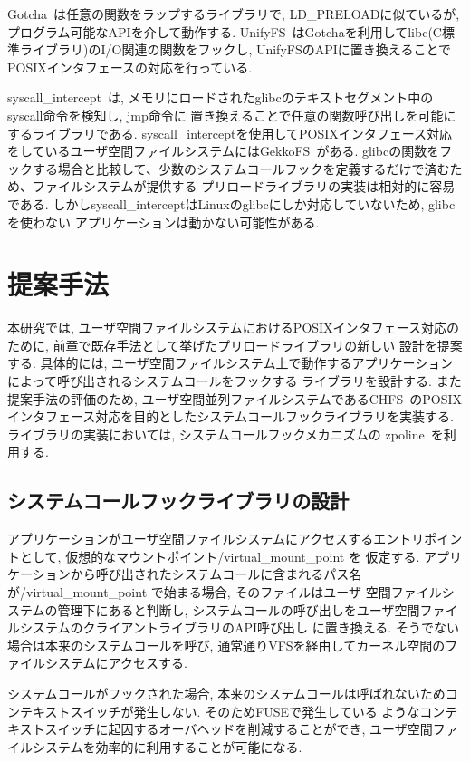 \documentclass[a4paper,11pt]{jreport}
\begin{document}
Gotcha~\cite{gotcha}は任意の関数をラップするライブラリで, LD\_PRELOADに似ているが, プログラム可能なAPIを介して動作する. 
UnifyFS~\cite{10177390}はGotchaを利用してlibc(C標準ライブラリ)のI/O関連の関数をフックし, UnifyFSのAPIに置き換えることで
POSIXインタフェースの対応を行っている.

syscall\_intercept~\cite{syscall-intercept}は, メモリにロードされたglibcのテキストセグメント中のsyscall命令を検知し, jmp命令に
置き換えることで任意の関数呼び出しを可能にするライブラリである.
syscall\_interceptを使用してPOSIXインタフェース対応をしているユーザ空間ファイルシステムにはGekkoFS~\cite{8514892}がある.
glibcの関数をフックする場合と比較して、少数のシステムコールフックを定義するだけで済むため、ファイルシステムが提供する
プリロードライブラリの実装は相対的に容易である. しかしsyscall\_interceptはLinuxのglibcにしか対応していないため, glibcを使わない
アプリケーションは動かない可能性がある.

\chapter{提案手法}
本研究では, ユーザ空間ファイルシステムにおけるPOSIXインタフェース対応のために, 前章で既存手法として挙げたプリロードライブラリの新しい
設計を提案する. 具体的には, ユーザ空間ファイルシステム上で動作するアプリケーションによって呼び出されるシステムコールをフックする
ライブラリを設計する. また提案手法の評価のため, ユーザ空間並列ファイルシステムであるCHFS~\cite{tatebe2022chfs}のPOSIX
インタフェース対応を目的としたシステムコールフックライブラリを実装する. ライブラリの実装においては, システムコールフックメカニズムの
zpoline~\cite{288689}を利用する.


\section{システムコールフックライブラリの設計}
アプリケーションがユーザ空間ファイルシステムにアクセスするエントリポイントとして, 仮想的なマウントポイント/virtual\_mount\_point を
仮定する. アプリケーションから呼び出されたシステムコールに含まれるパス名が/virtual\_mount\_point で始まる場合, そのファイルはユーザ
空間ファイルシステムの管理下にあると判断し, システムコールの呼び出しをユーザ空間ファイルシステムのクライアントライブラリのAPI呼び出し
に置き換える. そうでない場合は本来のシステムコールを呼び, 通常通りVFSを経由してカーネル空間のファイルシステムにアクセスする.

システムコールがフックされた場合, 本来のシステムコールは呼ばれないためコンテキストスイッチが発生しない. そのためFUSEで発生している
ようなコンテキストスイッチに起因するオーバヘッドを削減することができ, ユーザ空間ファイルシステムを効率的に利用することが可能になる.
\end{document}
